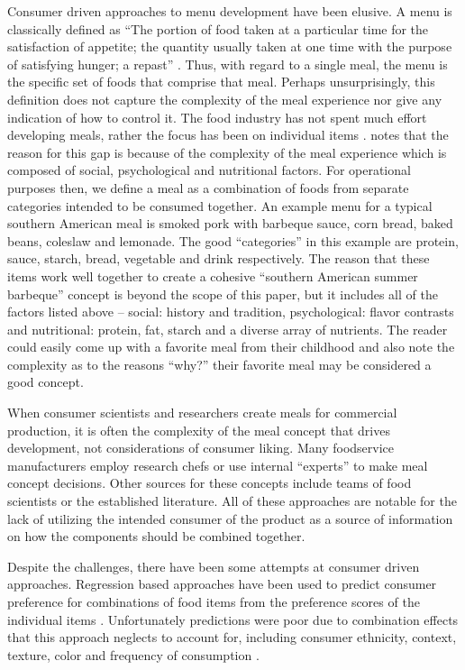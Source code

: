 Consumer driven approaches to menu development have been elusive.  A menu is classically defined as “The portion of food taken at a particular time for the satisfaction of appetite; the quantity usually taken at one time with the purpose of satisfying hunger; a repast” \citep{Webster1913}.  Thus, with regard to a single meal, the menu is the specific set of foods that comprise that meal.  Perhaps unsurprisingly, this definition does not capture the complexity of the meal experience nor give any indication of how to control it.  The food industry has not spent much effort developing meals, rather the focus has been on individual items \citep{Meiselman2000}.  \citet{Meiselman2000} notes that the reason for this gap is because of the complexity of the meal experience which is composed of social, psychological \citep[see esp.][chap. 2]{Lawless2010}  and nutritional factors.  For operational purposes then, we define a meal as a combination of foods from separate categories intended to be consumed together.  
An example menu for a typical southern American meal is smoked pork with barbeque sauce, corn bread, baked beans, coleslaw and lemonade.  The good “categories” in this example are protein, sauce, starch, bread, vegetable and drink respectively.  The reason that these items work well together to create a cohesive “southern American summer barbeque” concept is beyond the scope of this paper, but it includes all of the factors listed above – social: history and tradition, psychological: flavor contrasts \citep{Lawless1977,Lawless1979,Lawless1987,Lawless2010,Lawless2000} and nutritional: protein, fat, starch and a diverse array of nutrients.  The reader could easily come up with a favorite meal from their childhood and also note the complexity as to the reasons “why?” their favorite meal may be considered a good concept.   

When consumer scientists and researchers create meals for commercial production, it is often the complexity of the meal concept that drives development, not considerations of consumer liking.   Many foodservice manufacturers employ research chefs or use internal “experts” to make meal concept decisions.  Other sources for these concepts include teams of food scientists or the established literature.  All of these approaches are notable for the lack of utilizing the intended consumer of the product as a source of information on how the components should be combined together.  

Despite the challenges, there have been some attempts at consumer driven approaches.  Regression based approaches have been used to predict consumer preference for combinations of food items from the preference scores of the individual items \citep{Eindhoven1959,Hedderley1995,Moskowitz1995}.  Unfortunately predictions were poor due to combination effects that this approach neglects to account for, including consumer ethnicity, context, texture, color and frequency of consumption \citep{Eindhoven1959,Marshall2003,Niewind1986,Pilgrim1961}.  

